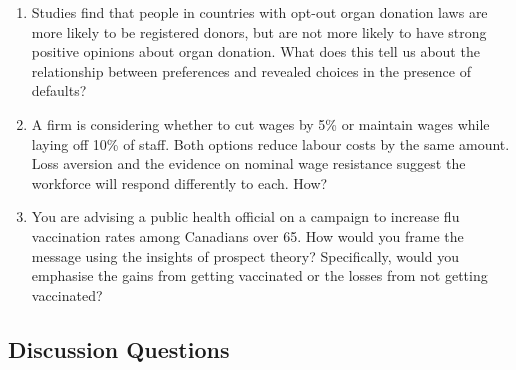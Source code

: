 \documentclass[12pt, letterpaper]{article}
\begin{document}
\begin{enumerate}
\item Studies find that people in countries with opt-out organ donation laws are more likely to be registered donors, but are not more likely to have strong positive opinions about organ donation. What does this tell us about the relationship between preferences and revealed choices in the presence of defaults?

\item A firm is considering whether to cut wages by 5\% or maintain wages while laying off 10\% of staff. Both options reduce labour costs by the same amount. Loss aversion and the evidence on nominal wage resistance suggest the workforce will respond differently to each. How?

\item You are advising a public health official on a campaign to increase flu vaccination rates among Canadians over 65. How would you frame the message using the insights of prospect theory? Specifically, would you emphasise the gains from getting vaccinated or the losses from not getting vaccinated?
\end{enumerate}


\subsection{Discussion Questions}
\end{document}
